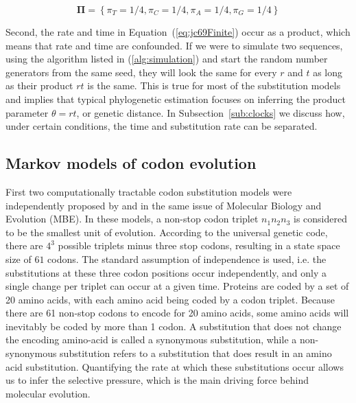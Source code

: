 \begin{equation}
\mathbf{\Pi}=\left\{ \pi_{T}=1/4,\pi_{C}=1/4,\pi_{A}=1/4,\pi_{G}=1/4\right\}
\label{eq:jc69Steady}
\end{equation}

\noindent
Second, the rate and time in Equation~(\ref{eq:jc69Finite}) occur as a product, which means that rate and time are confounded.
If we were to simulate two sequences, using the algorithm listed in (\ref{alg:simulation}) and start the random number generators from the same seed, they will look the same for every $r$ and $t$ as long as their product $rt$ is the same.
This is true for most of the substitution models and implies that typical phylogenetic estimation focuses on inferring the product parameter $\theta=rt$, or genetic distance.
In Subsection~\ref{sub:clocks} we discuss how, under certain conditions, the time and substitution rate can be separated.

\subsection{Markov models of codon evolution\label{sub:codon}}

First two computationally tractable codon substitution models were independently proposed by \cite{Muse1994} and \cite{Goldman1994} in the same issue of Molecular Biology and Evolution (MBE).
In these models, a non-stop codon triplet $n_{1}n_{2}n_{3}$ is considered to be the smallest unit of evolution.
According to the universal genetic code, there are $4^3$ possible triplets minus three stop codons, resulting in a state space size of $61$ codons.
The standard assumption of independence is used, i.e. the substitutions at these three codon positions occur independently, and only a single change per triplet can occur at a given time. 
Proteins are coded by a set of 20 amino acids, with each amino acid being coded by a codon triplet. 
Because there are 61 non-stop codons to encode for 20 amino acids, some amino acids will inevitably be coded by more than 1 codon.
A substitution that does not change the encoding amino-acid is called a synonymous substitution, while a non-synonymous substitution refers to a substitution that does result in an amino acid substitution.
Quantifying the rate at which these substitutions occur allows us to infer the selective pressure, which is the main driving force behind molecular evolution.

